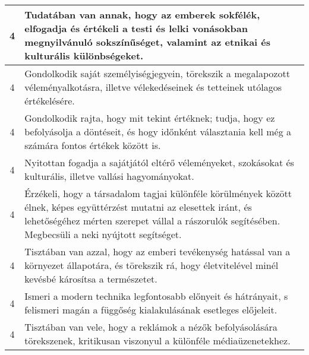 \begin{longtable}{c | p{12cm} }
                                
                                          4 &  Tudatában van annak, hogy az emberek sokfélék, elfogadja és értékeli a testi és lelki vonásokban megnyilvánuló sokszínűséget, valamint az etnikai és kulturális különbségeket. \\ \hline
                                          4 &  Gondolkodik saját személyiségjegyein, törekszik a megalapozott véleményalkotásra, illetve vélekedéseinek és tetteinek utólagos értékelésére. \\ \hline
                                          4 &  Gondolkodik rajta, hogy mit tekint értéknek; tudja, hogy ez befolyásolja a döntéseit, és hogy időnként választania kell még a számára fontos értékek között is. \\ \hline
                                          4 &  Nyitottan fogadja a sajátjától eltérő véleményeket, szokásokat és kulturális, illetve vallási hagyományokat. \\ \hline
                                          4 &  Érzékeli, hogy a társadalom tagjai különféle körülmények között élnek, képes együttérzést mutatni az elesettek iránt, és lehetőségéhez mérten szerepet vállal a rászorulók segítésében. Megbecsüli a neki nyújtott segítséget. \\ \hline
                                          4 &  Tisztában van azzal, hogy az emberi tevékenység hatással van a környezet állapotára, és törekszik rá, hogy életvitelével minél kevésbé károsítsa a természetet. \\ \hline
                                          4 &  Ismeri a modern technika legfontosabb előnyeit és hátrányait, s felismeri magán a függőség kialakulásának esetleges előjeleit. \\ \hline
                                          4 &  Tisztában van vele, hogy a reklámok a nézők befolyásolására törekszenek, kritikusan viszonyul a különféle médiaüzenetekhez. \\ \hline
                                      
                        \end{longtable}
            \clearpage

